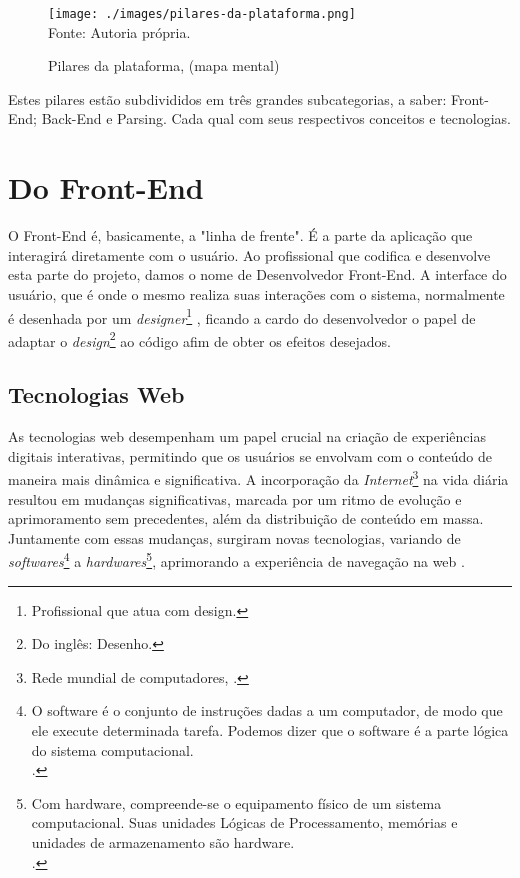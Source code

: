 \begin{figure}[H]
    \centering
    \caption{Pilares da plataforma, (mapa mental)}
    \texttt{[image: ./images/pilares-da-plataforma.png]}
    \label{fig:pilares-da-plataforma} \\
    \textnormal{\fontsize{10pt}{12pt}Fonte: Autoria própria.}
\end{figure}

Estes pilares estão subdivididos em três grandes subcategorias, a saber: Front-End;
Back-End e Parsing. Cada qual com seus respectivos conceitos e tecnologias.

\section{Do Front-End}

O Front-End é, basicamente, a "linha de frente". É a parte da aplicação que interagirá
diretamente com o usuário. Ao profissional que codifica e desenvolve esta parte do
projeto, damos o nome de Desenvolvedor Front-End. A interface do usuário, que é
onde o mesmo realiza suas interações com o sistema, normalmente é desenhada por
um
\textit{designer}\footnote{Profissional que atua com design.
}
, ficando a cardo do desenvolvedor o papel de adaptar o
\textit{design}\footnote{Do inglês: Desenho.
}
ao código afim de obter os efeitos desejados.
\cite{totvs-front-end}

\subsection{Tecnologias Web}

As tecnologias
\acrshort{web}
desempenham um papel crucial na criação de experiências
digitais interativas, permitindo que os usuários se envolvam com o conteúdo de maneira mais
dinâmica e significativa. A incorporação da
\textit{Internet}\footnote{Rede mundial de computadores, \cite{marco-civil-art-2}.
}
na vida diária resultou em mudanças
significativas, marcada por um ritmo de evolução e aprimoramento sem precedentes, além da
distribuição de conteúdo em massa. Juntamente com essas mudanças, surgiram novas
tecnologias, variando de
\textit{softwares}\footnote{O software é o conjunto de instruções dadas a um computador, de modo que
    ele execute determinada tarefa. Podemos dizer que o software é
    a parte lógica do sistema computacional.  \\  \cite{hardware-e-software}.
}
a
\textit{hardwares}\footnote{Com hardware, compreende-se o equipamento físico de um sistema computacional.
    Suas unidades Lógicas de Processamento, memórias e unidades de armazenamento são
    hardware.  \\  \cite{hardware-e-software}.
},
aprimorando a experiência de navegação na
\acrshort{web}
\cite{molgado}.

